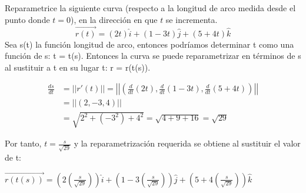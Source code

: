 \documentclass[12pt]{article}
\begin{document}
\section{}
Reparametrice la siguiente curva (respecto a la longitud de arco medida desde el punto donde $t = 0$), en la dirección en que $t$ se incrementa.
$$ \vec{r(t)}=(2t)\hat{i}+(1-3t)\hat{j}+(5+4t)\hat{k}$$
Sea s(t) la función longitud de arco, entonces podríamos determinar t como una función de s: t = t(s). Entonces la curva se puede reparametrizar en términos de s al sustituir a t en su lugar t: r = r(t(s)).

\begin{align*}
  \frac{ds}{dt} &= || r'(t)|| = \left|\left| \left( \frac{d}{dt} (2t), \frac{d}{dt} (1-3t),   \frac{d}{dt} (5+4t)  \right) \right| \right| \\
  &=  \left|\left| \left(2, -3,  4  \right) \right| \right| \\
  &= \sqrt{2^2+ (-3^2) + 4^2} = \sqrt{4+ 9 + 16} = \sqrt{29}
\end{align*}

Por tanto, $t = \frac{s}{\sqrt{29}}$ y la reparametrización requerida se obtiene al sustituir el valor de t:

$ \vec{r(t(s))} = (2(\frac{s}{\sqrt{29}}))\hat{i}+(1-3( \frac{s}{\sqrt{29}}))\hat{j}+(5+4( \frac{s}{\sqrt{29}}))\hat{k} $
\end{document}
